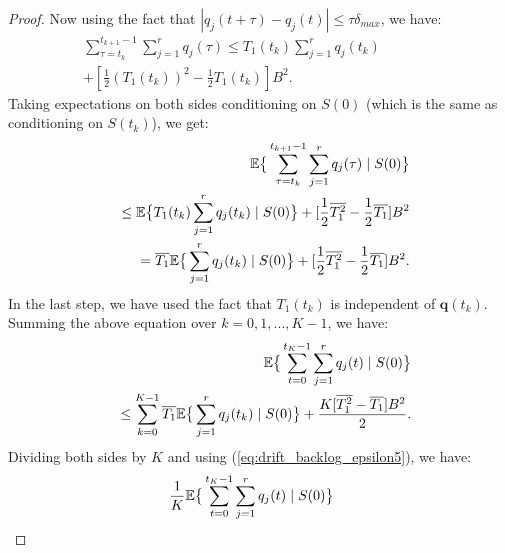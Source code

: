 \documentclass[journal]{IEEEtran}
\newcommand{\expect}[1]{\mathbb{E}\big\{#1\big\}}
\newcommand{\bv}[1]{{\boldsymbol{#1} }}
\begin{document}
\begin{proof}
Now using the fact that $|q_j(t+\tau)-q_j(t)|\leq\tau\delta_{max}$, we have:
\begin{eqnarray*}
\sum_{\tau=t_{k}}^{t_{k+1}-1}\sum_{j=1}^rq_j(\tau)\leq T_{1}(t_k)\sum_{j=1}^rq_j(t_{k})\qquad\qquad\\
+[\frac{1}{2}(T_1(t_k))^2-\frac{1}{2}T_1(t_k)]B^2.
\end{eqnarray*}
Taking expectations on both sides conditioning on $S(0)$ (which is the same as conditioning on $S(t_k)$), we get:
\begin{eqnarray*}
\hspace{-.3in}&&\expect{\sum_{\tau=t_{k}}^{t_{k+1}-1}\sum_{j=1}^rq_j(\tau)\left.|\right. S(0)}\\
\hspace{-.3in}&&\qquad\leq \expect{T_{1}(t_k)\sum_{j=1}^rq_j(t_{k})\left.|\right. S(0)}
+[\frac{1}{2}\overline{T_1^2}-\frac{1}{2}\overline{T_1}]B^2\\
\hspace{-.3in}&&\qquad = \overline{T_1}\expect{\sum_{j=1}^rq_j(t_{k})\left.|\right. S(0)}
+[\frac{1}{2}\overline{T_1^2}-\frac{1}{2}\overline{T_1}]B^2.
\end{eqnarray*}
In the last step, we have used the fact that $T_1(t_k)$ is independent of $\bv{q}(t_k)$. 
Summing the above equation over $k=0, 1, ..., K-1$, we have:
\begin{eqnarray*}
\hspace{-.3in}&&\expect{\sum_{t=0}^{t_K-1}\sum_{j=1}^rq_j(t)\left.|\right. S(0)} \\
\hspace{-.3in}&&\qquad\leq \sum_{k=0}^{K-1} \overline{T_1}\expect{\sum_{j=1}^rq_j(t_k)\left.|\right. S(0)} + \frac{K[\overline{T_1^2}-\overline{T_1}]B^2}{2}.
\end{eqnarray*}
Dividing both sides by $K$ and using (\ref{eq:drift_backlog_epsilon5}), we have:
\begin{eqnarray*}
\hspace{-.3in}&&\frac{1}{K}\expect{\sum_{t=0}^{t_K-1}\sum_{j=1}^rq_j(t)\left.|\right. S(0)} \\

\end{eqnarray*}
\end{proof}
\end{document}
